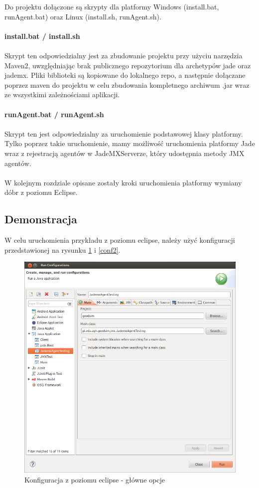 \documentclass[a4paper,12pt]{article}
\begin{document}
Do projektu dołączone są skrypty dla platformy Windows (install.bat, runAgent.bat) oraz Linux (install.sh, runAgent.sh).
\\ \\
\textbf{install.bat / install.sh}
\\ \\
Skrypt ten odpowiedzialny jest za zbudowanie projektu przy użyciu narzędzia Maven2, uwzględniając brak publicznego repozytorium dla archetypów jade oraz jademx. Pliki biblioteki są kopiowane do lokalnego repo, a następnie dołączane poprzez maven do projektu w celu zbudowania kompletnego archiwum .jar wraz ze wszystkimi zależnościami aplikacji.
\\ \\
\textbf{runAgent.bat / runAgent.sh}
\\ \\
Skrypt ten jest odpowiedzialny za uruchomienie podstawowej klasy platformy. Tylko poprzez takie uruchomienie, mamy możliwość uruchomienia platformy Jade wraz z rejestracją agentów w JadeMXServerze, który udostępnia metody JMX agentów.
\\ \\
W kolejnym rozdziale opisane zostały kroki uruchomienia platformy wymiany dóbr z poziomu Eclipse.

\newpage

\subsection{Demonstracja}

W celu uruchomienia przykładu z poziomu eclipse, należy użyć konfiguracji przedstawionej na rysunku \ref{conf1} i \ref{conf2}.

\begin{figure}[!b]
\centering
\includegraphics[scale=0.5]{gfx/PlatformaWymianyDobr-img5.png}
\caption{Konfiguracja z poziomu eclipse - główne opcje}
\label{conf1}
\end{figure}
\end{document}
